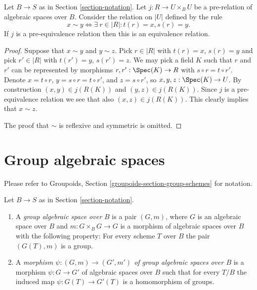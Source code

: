 \begin{lemma}
\label{lemma-pre-equivalence-equivalence-relation-points}
Let $B \to S$ as in Section \ref{section-notation}.
Let $j : R \to U \times_B U$ be a pre-relation of algebraic spaces over $B$.
Consider the relation on $|U|$ defined by the rule
$$
x \sim y
\Leftrightarrow
\exists\ r \in |R| :
t(r) = x,
s(r) = y.
$$
If $j$ is a pre-equivalence relation then this is an equivalence relation.
\end{lemma}

\begin{proof}
Suppose that $x \sim y$ and $y \sim z$.
Pick $r \in |R|$ with $t(r) = x$, $s(r) = y$ and
pick $r' \in |R|$ with $t(r') = y$, $s(r') = z$.
We may pick a field $K$ such that $r$ and $r'$ can be
represented by morphisms $r, r' : \Spec(K) \to R$
with $s \circ r = t \circ r'$.
Denote $x = t \circ r$, $y = s \circ r = t \circ r'$,
and $z = s \circ r'$, so $x, y, z : \Spec(K) \to U$.
By construction $(x, y) \in j(R(K))$ and
$(y, z) \in j(R(K))$. Since $j$ is a pre-equivalence relation
we see that also $(x, z) \in j(R(K))$.
This clearly implies that $x \sim z$.

\medskip\noindent
The proof that $\sim$ is reflexive and symmetric is omitted.
\end{proof}















\section{Group algebraic spaces}
\label{section-group-spaces}

\noindent
Please refer to
Groupoids, Section \ref{groupoids-section-group-schemes}
for notation.

\begin{definition}
\label{definition-group-space}
Let $B \to S$ as in Section \ref{section-notation}.
\begin{enumerate}
\item A {\it group algebraic space over $B$} is a pair $(G, m)$, where
$G$ is an algebraic space over $B$ and $m : G \times_B G \to G$ is
a morphism of algebraic spaces over $B$ with the following property:
For every scheme $T$ over $B$ the pair $(G(T), m)$ is a group.
\item A {\it morphism $\psi : (G, m) \to (G', m')$ of
group algebraic spaces over $B$}
is a morphism $\psi : G \to G'$ of algebraic spaces over $B$ such that for
every $T/B$ the induced map $\psi : G(T) \to G'(T)$ is a homomorphism
of groups.
\end{enumerate}
\end{definition}

